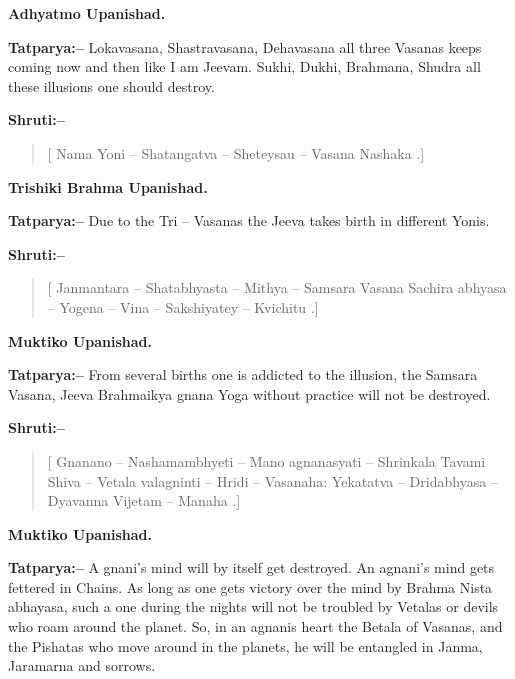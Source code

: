 \begin{flushright}
\textbf{Adhyatmo Upanishad.}
\end{flushright}

\textbf{Tatparya:–} Lokavasana, Shastravasana, Dehavasana all three Vasanas keeps coming now and then like I am Jeevam. Sukhi, Dukhi, Brahmana, Shudra all these illusions one should destroy.

\textbf{Shruti:–}

\begin{verse}
[ Nama Yoni – Shatangatva – Sheteysau – Vasana Nashaka .]
\end{verse}

\begin{flushright}
\textbf{Trishiki Brahma Upanishad.}
\end{flushright}

\textbf{Tatparya:–} Due to the Tri – Vasanas the Jeeva takes birth in different Yonis.

\textbf{Shruti:–}

\begin{verse}
[ Janmantara – Shatabhyasta – Mithya – Samsara Vasana  Sachira abhyasa – Yogena – Vina – Sakshiyatey – Kvichitu .]
\end{verse}

\begin{flushright}
\textbf{Muktiko Upanishad.}
\end{flushright}

\textbf{Tatparya:–} From several births one is addicted to the illusion, the Samsara Vasana, Jeeva Brahmaikya gnana Yoga without practice will not be destroyed.

\textbf{Shruti:–}

\begin{verse}
[ Gnanano – Nashamambhyeti – Mano agnanasyati – Shrinkala  Tavami Shiva – Vetala valagninti – Hridi – Vasanaha: Yekatatva – Dridabhyasa – Dyavanna Vijetam – Manaha .]
\end{verse}

\begin{flushright}
\textbf{Muktiko Upanishad.}
\end{flushright}

\textbf{Tatparya:–} A gnani's mind will by itself get destroyed. An agnani's mind gets fettered in Chains. As long as one gets victory over the mind by Brahma Nista abhayasa, such a one during the nights will not be troubled by Vetalas or devils who roam around the planet. So, in an agnanis heart the Betala of Vasanas, and the Pishatas who move around in the planets, he will be entangled in Janma, Jaramarna and sorrows.


